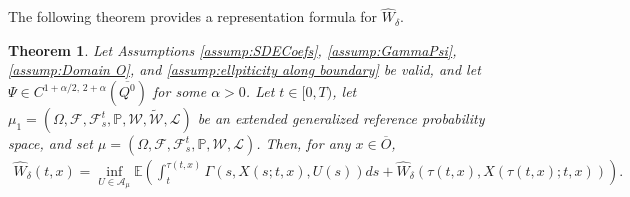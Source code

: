 \documentclass[amscd,amssymb,11pt]{article}
\newtheorem{theorem}{Theorem}
\numberwithin{theorem}{section}
\numberwithin{equation}{section}
\begin{document}
The following theorem provides a representation formula for $\widehat{W}_{\delta}$.
\begin{theorem}\label{thm:DPWdelta}
Let Assumptions \ref{assump:SDECoefs}, \ref{assump:GammaPsi}, \ref{assump:Domain O}, and \ref{assump:ellpiticity along boundary} be valid, and let $\Psi\in C^{1+\alpha/2,\,2+\alpha}(\overline{Q^{0}})$ for some $\alpha>0$. Let $t\in[0,T)$, let $\mu_{1}=(\Omega,\mathscr{F},\mathscr{F}_{s}^{t},\mathbb{P},\mathcal{W},\widetilde{\mathcal{W}},\mathcal{L})$
be an extended generalized reference probability space, and set $\mu=(\Omega,\mathscr{F},\mathscr{F}_{s}^{t},\mathbb{P},\mathcal{W},\mathcal{L})$. Then, for any $x\in\overline{O}$,
\begin{align}\label{eq:DPWdelta}
\widehat{W}_{\delta}(t,x)=\inf_{U\in\mathcal{A}_{\mu}}\mathbb{E}\left(\int_{t}^{\tau(t,x)}\Gamma\left(s,X(s;t,x),U(s)\right)ds+\widehat{W}_{\delta}\left(\tau(t,x),X(\tau(t,x);t,x)\right)\right).
\end{align}
\end{theorem}
\end{document}
